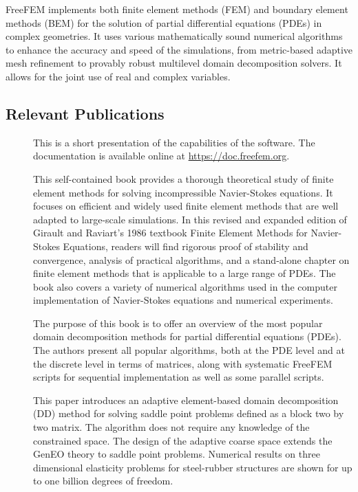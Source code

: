 FreeFEM implements both finite element methods (FEM) and boundary element methods (BEM) for the solution of partial differential equations (PDEs) in complex geometries. It uses various mathematically sound numerical algorithms to enhance the accuracy and speed of the simulations, from metric-based adaptive mesh refinement to provably robust multilevel domain decomposition solvers. It allows for the joint use of real and complex variables.


\subsection{Relevant Publications}
\label{sec:Freefem++:publications}

\begin{description}
\item[] This is a short presentation of the capabilities of the software. The documentation is available online at \url{https://doc.freefem.org}.

\item[] This self-contained book provides a thorough theoretical study of finite element methods for solving incompressible Navier-Stokes equations. It focuses on efficient and widely used finite element methods that are well adapted to large-scale simulations. In this revised and expanded edition of Girault and Raviart's 1986 textbook Finite Element Methods for Navier-Stokes Equations, readers will find rigorous proof of stability and convergence, analysis of practical algorithms, and a stand-alone chapter on finite element methods that is applicable to a large range of PDEs. The book also covers a variety of numerical algorithms used in the computer implementation of Navier-Stokes equations and numerical experiments.

\item[] The purpose of this book is to offer an overview of the most popular domain decomposition methods for partial differential equations (PDEs). The authors present all popular algorithms, both at the PDE level and at the discrete level in terms of matrices, along with systematic FreeFEM scripts for sequential implementation as well as some parallel scripts.

\item[] This paper introduces an adaptive element-based domain decomposition (DD) method for solving saddle point problems defined as a block two by two matrix. The algorithm does not require any knowledge of the constrained space. The design of the adaptive coarse space extends the GenEO theory to saddle point problems. Numerical results on three dimensional elasticity problems for steel-rubber structures are shown for up to one billion degrees of freedom.


\end{description}
